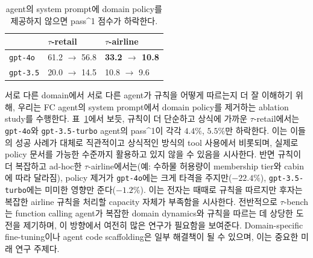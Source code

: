 \documentclass{article}
\newcommand{\benchmark}{$\tau$-bench}
\newcommand{\retail}{$\tau$-retail}  %
\newcommand{\airline}{$\tau$-airline}
\begin{document}
\begin{table}
\vspace{-10pt}

    \small
    \begin{tabular}{l|ll}
    \toprule
        & \retail & \airline \\
    \midrule
    \texttt{gpt-4o} & 61.2 $\to$ 56.8 & \textbf{33.2 $\to$ 10.8} \\
    \texttt{gpt-3.5} & 20.0 $\to$ 14.5 & 10.8 $\to$ 9.6\\
    \bottomrule
    \end{tabular}
    \caption{agent의 system prompt에 domain policy를 제공하지 않으면 pass\textasciicircum 1 점수가 하락한다.}
    \label{tab:ablate_policy}
    \vspace{0pt}
\end{table}
서로 다른 domain에서 서로 다른 agent가 규칙을 어떻게 따르는지 더 잘 이해하기 위해, 우리는 FC agent의 system prompt에서 domain policy를 제거하는 ablation study를 수행한다. 표~\ref{tab:ablate_policy}에서 보듯, 규칙이 더 단순하고 상식에 가까운 \retail{}에서는 \texttt{gpt-4o}와 \texttt{gpt-3.5-turbo} agent의 pass\textasciicircum 1이 각각 $4.4\%$, $5.5\%$만 하락한다. 이는 이들의 성공 사례가 대체로 직관적이고 상식적인 방식의 tool 사용에서 비롯되며, 실제로 policy 문서를 가능한 수준까지 활용하고 있지 않을 수 있음을 시사한다. 반면 규칙이 더 복잡하고 ad-hoc한 \airline{}에서는(예: 수하물 허용량이 membership tier와 cabin에 따라 달라짐), policy 제거가 \texttt{gpt-4o}에는 크게 타격을 주지만($-22.4\%$), \texttt{gpt-3.5-turbo}에는 미미한 영향만 준다($-1.2\%$). 이는 전자는 때때로 규칙을 따르지만 후자는 복잡한 airline 규칙을 처리할 capacity 자체가 부족함을 시사한다. 전반적으로 \benchmark{}는 function calling agent가 복잡한 domain dynamics와 규칙을 따르는 데 상당한 도전을 제기하며, 이 방향에서 여전히 많은 연구가 필요함을 보여준다. Domain-specific fine-tuning이나 agent code scaffolding은 일부 해결책이 될 수 있으며, 이는 중요한 미래 연구 주제다.
\end{document}
